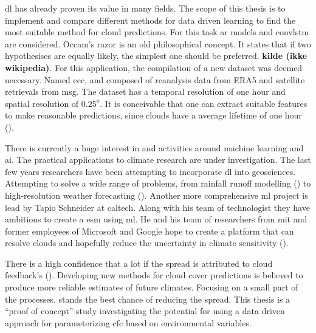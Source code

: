 \acrshort{dl} has already proven its value in many fields. The scope of this thesis is to implement and compare different methods for data driven learning to find the most suitable method for cloud predictions. For this task \acrfull{ar} models and \acrfull{convlstm} are considered. 
Occam's razor is an old philosophical concept. It states that if two hypothesises are equally likely, the simplest one should be preferred. \textbf{kilde (ikke wikipedia)}. For this application, the compilation of a new dataset was deemed necessary. Named \acrfull{ecc}, and composed of reanalysis data from ERA5 and satellite retrievals from \acrfull{msg}. The dataset has a temporal resolution of one hour and spatial resolution of $0.25^o$. It is conceivable that one can extract suitable features to make reasonable predictions, since clouds have a average lifetime of one hour (\cite{lohmann2016}). 

There is currently a huge interest in and activities around machine learning and \acrshort{ai}. The practical applications to climate research are under investigation. The last few years researchers have been attempting to incorporate \acrshort{dl} into geosciences. Attempting to solve a wide range of problems, from rainfall runoff modelling (\cite{hess-23-5089-2019}) to  high-resolution weather forecasting (\cite{Rodrigues2018DeepDownscale:Forecast}). Another more comprehensive \acrshort{ml} project is lead by Tapio Schneider at \acrfull{caltech}. Along with his team of technologist they have ambitions to create a \acrshort{esm} using \acrshort{ml}. He and his team of researchers from \acrfull{mit} and former employees of Microsoft and Google hope to create a platform that can resolve clouds and hopefully reduce the uncertainty in climate sensitivity (\cite{Voosen2018ScienceIntelligence}).

There is a high confidence that a lot if the spread is attributed to cloud feedback's (\cite{IPCC_CH9_climate_models}). Developing new methods for cloud cover predictions is believed to produce more reliable estimates of future climates. Focusing on a small part of the processes, stands the best chance of reducing the spread. This thesis is a ``proof of concept'' study investigating the potential for using a data driven approach for parameterizing \acrfull{cfc} based on environmental variables.

